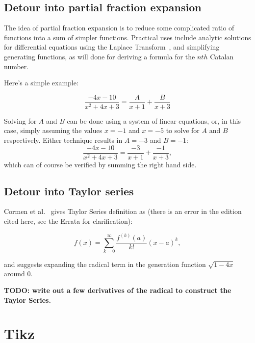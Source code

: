 \documentclass{article}
\begin{document}
\subsection{Detour into partial fraction expansion}

The idea of partial fraction expansion is to reduce some
complicated ratio of functions into a sum of simpler functions.
Practical uses include analytic solutions for differential equations
using the Laplace Transform~\cite[p. 347]{nagle:rk1989}, and simplifying
generating functions, as will done for deriving a formula for the
$nth$ Catalan number.

Here's a simple example:

\begin{equation}
\frac{-4x-10}{x^2+4x+3} = \frac{A}{x+1} + \frac{B}{x+3}
\end{equation}

Solving for $A$ and $B$ can be done using a system of linear equations,
or, in this case, simply assuming the values $x = -1$ and $x = -5$
to solve for $A$ and $B$ respectively. Either technique results in $A = -3$ and
$B = -1$:
\begin{equation}
\frac{-4x-10}{x^2+4x+3} = \frac{-3}{x+1} + \frac{-1}{x+3},
\end{equation}
which can of course be verified by summing the right hand side.


\subsection{Detour into Taylor series}

Cormen et al.~\cite[p. 262]{cormen:th:1990} gives Taylor Series definition as
(there is an error in the edition cited here, see the Errata for clarification):

\begin{equation}
f(x) = \sum_{k=0}^{\infty} \frac{f^{(k)}(a)}{k!}(x-a)^k,
\end{equation}

and suggests expanding the radical term in the generation function
$\sqrt{1-4x}$ around $0$.

{\bf TODO: write out a few derivatives of the radical to construct
the Taylor Series.}

\section{Tikz}

\end{document}
